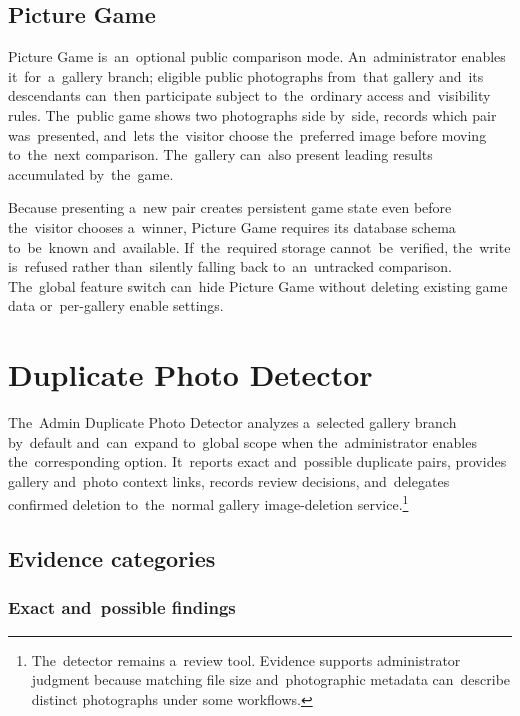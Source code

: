 \documentclass[11pt,a4paper]{article}
\begin{document}
\subsection{Picture Game}

Picture Game is~an~optional public comparison mode. An~administrator enables
it~for~a~gallery branch; eligible public photographs from~that gallery and~its
descendants can~then participate subject to~the~ordinary access and~visibility
rules. The~public game shows two photographs side by~side, records which pair
was~presented, and~lets the~visitor choose the~preferred image before moving
to~the~next comparison. The~gallery can~also present leading results accumulated
by~the~game.

Because presenting a~new pair creates persistent game state even before
the~visitor chooses a~winner, Picture Game requires its database schema
to~be~known and~available. If~the~required storage cannot~be~verified, the~write
is~refused rather than~silently falling back to~an~untracked comparison.
The~global feature switch can~hide Picture Game without deleting existing game
data or~per-gallery enable settings.

\section{Duplicate Photo Detector}
\label{sec:duplicates}

The~Admin Duplicate Photo Detector analyzes a~selected gallery branch by~default
and~can~expand to~global scope when the~administrator enables the~corresponding
option. It~reports exact and~possible duplicate pairs, provides gallery
and~photo context links, records review decisions, and~delegates confirmed
deletion to~the~normal gallery image-deletion service.\footnote{The~detector
remains a~review tool. Evidence supports administrator judgment because matching
file size and~photographic metadata can~describe distinct photographs under some
workflows.}

\subsection{Evidence categories}

\subsubsection{Exact and~possible findings}
\end{document}
